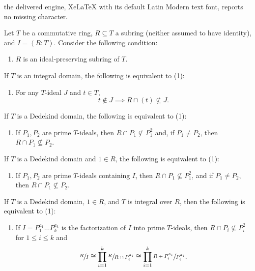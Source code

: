 \documentclass[10pt,a4paper]{amsart}
\newcommand{\quot}[2]{\large\sfrac{#1}{#2}\normalsize}
\begin{document}
the delivered engine, XeLaTeX with its default Latin Modern text font, reports no missing character.
	\begin{theorem}
		\label{ip equiv conditions}
		Let $T$ be a commutative ring, $R\subseteq T$ a subring (neither assumed to have identity), and $I=(R:T)$. Consider the following condition:
		\begin{enumerate}
			\item $R$ is an ideal-preserving subring of $T$.
		\end{enumerate}
		If $T$ is an integral domain, the following is equivalent to (1):
		\begin{enumerate}
			\item[(2)] For any $T$-ideal $J$ and $t\in T$, $$t\notin J\implies R\cap (t)\nsubseteq J.$$
		\end{enumerate}
		If $T$ is a Dedekind domain, the following is equivalent to (1):
		\begin{enumerate}
			\item[(3)] If $P_1,P_2$ are prime $T$-ideals, then $R\cap P_1\nsubseteq P_1^2$ and, if $P_1\neq P_2$, then $R\cap P_1\nsubseteq P_2$.
		\end{enumerate}
		If $T$ is a Dedekind domain and $1\in R$, the following is equivalent to (1):
		\begin{enumerate}
			\item[(4)] If $P_1,P_2$ are prime $T$-ideals containing $I$, then $R\cap P_1\nsubseteq P_1^2$, and if $P_1\neq P_2$, then $R\cap P_1\nsubseteq P_2$.
		\end{enumerate}
		If $T$ is a Dedekind domain, $1\in R$, and $T$ is integral over $R$, then the following is equivalent to (1):
		\begin{enumerate}
			\item[(5)] If $I=P_1^{a_1}\dots P_k^{a_k}$ is the factorization of $I$ into prime $T$-ideals, then $R\cap P_i\nsubseteq P_i^2$ for $1\leq i\leq k$ and 
			$$\quot{R}{I}\cong \prod_{i=1}^k\quot{R}{R\cap P_i^{a_i}}\cong \prod_{i=1}^k\quot{R+P_i^{a_i}}{P_i^{a_i}}.$$
		\end{enumerate}
	\end{theorem}
\end{document}
